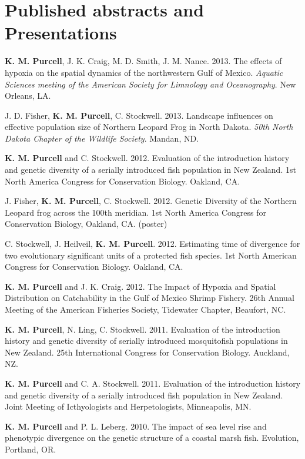 \documentclass[letterpaper]{article}
\renewenvironment{itemize}{
  \begin{list}{}{
    \setlength{\leftmargin}{1em}
  }
}{
  \end{list}
}
\begin{document}
\section*{Published abstracts and Presentations}
	\begin{itemize}
		\item \textbf{K. M. Purcell}, J. K. Craig, M. D. Smith, J. M. Nance. 2013. The effects of hypoxia on the spatial dynamics of the northwestern Gulf of Mexico. \textit{Aquatic Sciences meeting of the American Society for Limnology and Oceanography}. New Orleans, LA.
		\item J. D. Fisher, \textbf{K. M. Purcell}, C. Stockwell. 2013. Landscape influences on effective population size of Northern Leopard Frog in North Dakota. \textit{50th North Dakota Chapter of the Wildlife Society}. Mandan, ND.
		\item \textbf{K. M. Purcell} and C. Stockwell. 2012. Evaluation of the introduction history and genetic diversity of a serially introduced fish population in New Zealand. 1st North America Congress for Conservation Biology. Oakland, CA.
		\item J. Fisher, \textbf{K. M. Purcell}, C. Stockwell. 2012. Genetic Diversity of the Northern Leopard frog across the 100th meridian. 1st North America Congress for Conservation Biology, Oakland, CA. (poster)
		\item C. Stockwell, J. Heilveil, \textbf{K. M. Purcell}. 2012. Estimating time of divergence for two evolutionary significant units of a protected fish species. 1st North American Congress for Conservation Biology. Oakland, CA.
		\item \textbf{K. M. Purcell} and J. K. Craig. 2012. The Impact of Hypoxia and Spatial Distribution on Catchability in the Gulf of Mexico Shrimp Fishery. 26th Annual Meeting of the American Fisheries Society, Tidewater Chapter, Beaufort, NC.
		\item \textbf{K. M. Purcell}, N. Ling, C. Stockwell. 2011. Evaluation of the introduction history and genetic diversity of serially introduced mosquitofish populations in New Zealand. 25th International Congress for Conservation Biology. Auckland, NZ.
		\item \textbf{K. M. Purcell} and C. A. Stockwell. 2011. Evaluation of the introduction history and genetic diversity of a serially introduced fish population in New Zealand. Joint Meeting of Icthyologists and Herpetologists, Minneapolis, MN.
		\item \textbf{K. M. Purcell} and P. L. Leberg. 2010. The impact of sea level rise and phenotypic divergence on the genetic structure of a coastal marsh fish. Evolution, Portland, OR.

\end{itemize}
\end{document}
